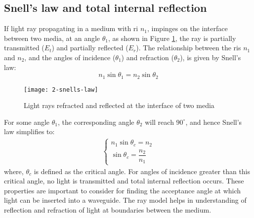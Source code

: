 \documentclass[../report.tex]{subfiles}
\begin{document}
		\subsection{Snell's law and total internal reflection}
If light ray propagating in a medium with \gls{ri} $n_1$, impinges on the interface between two media, at an angle $\theta_1$, as shown in Figure \ref{fig:2_snells_law}, the ray is partially transmitted ($E_t$) and partially reflected ($E_r$). The relationship between the \gls{ri}s $n_1$ and $n_2$, and the angles of incidence ($\theta_1$) and refraction ($\theta_2$), is given by Snell's law:
\begin{equation}\label{eq:snells_law}
n_1 \sin \theta_1 = n_2 \sin \theta_2
\end{equation}
\begin{figure}[H]
	\centering
	\texttt{[image: 2-snells-law]}
	\caption{Light rays refracted and reflected at the interface of two media}
	\label{fig:2_snells_law}
\end{figure}
For some angle $\theta_1$, the corresponding angle $\theta_2$ will reach $90^{\circ}$, and hence Snell’s law simplifies to:
\begin{equation}\label{eq:critical angle}
\begin{aligned}
\begin{cases}
n_1 \sin \theta_c = n_2\\
\sin \theta_c = \dfrac{n_2}{n_1}
\end{cases}
\end{aligned}
\end{equation}
where, $\theta_c$ is defined as the critical angle. For angles of incidence greater than this critical angle, no light is transmitted and total internal reflection occurs. These properties are important to consider for finding the acceptance angle at which light can be inserted into a waveguide. The ray model helps in understanding of reflection and refraction of light at boundaries between the medium.
		
\end{document}
